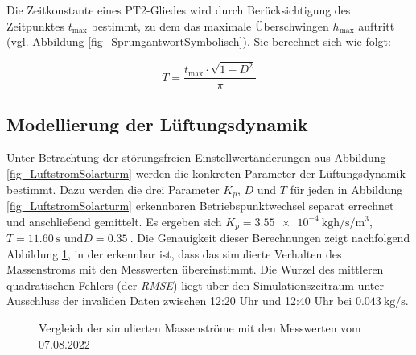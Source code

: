 Die Zeitkonstante eines PT2-Gliedes wird durch Berücksichtigung des Zeitpunktes $t_{\mathrm{max}}$ bestimmt, zu dem das maximale Überschwingen $h_{\mathrm{max}}$ auftritt (vgl. Abbildung \ref{fig_SprungantwortSymbolisch}).
Sie berechnet sich wie folgt:

\begin{equation} \label{eq_BerechnungT}
    T = \frac{t_{\mathrm{max}} \cdot \sqrt{1-D^2}}{\pi}
\end{equation}


\subsection{Modellierung der Lüftungsdynamik} \label{subsec_BeschreibungLüftungsDyn}
Unter Betrachtung der störungsfreien Einstellwertänderungen aus Abbildung \ref{fig_LuftstromSolarturm} werden die konkreten Parameter der Lüftungsdynamik bestimmt.
Dazu werden die drei Parameter $K_p$, $D$ und $T$ für jeden in Abbildung \ref{fig_LuftstromSolarturm} erkennbaren Betriebspunktwechsel separat errechnet und anschließend gemittelt.
Es ergeben sich $K_p = \SI{3.55e-4}{\kilo\gram\hour\per\second\per\metre\cubed}$, $T = \SI{11.60}{\second}$ und\linebreak $D = \SI{0.35}{}$.
Die Genauigkeit dieser Berechnungen zeigt nachfolgend Abbildung \ref{fig_LuftstromplusSimulativ}, in der erkennbar ist, dass das simulierte Verhalten des Massenstroms mit den Messwerten übereinstimmt.
Die Wurzel des mittleren quadratischen Fehlers (der \textit{RMSE}) liegt über den Simulationszeitraum unter Ausschluss der invaliden Daten zwischen 12:20 Uhr und 12:40 Uhr bei $\SI{0.043}{\kilo\gram\per\second}$.

\begin{figure}[h!]
    \centering
    \setlength{\fboxsep}{1pt}
    \setlength{\fboxrule}{1pt}
    \caption[Vergleich der simulierten Massenströme mit den Messwerten vom 07.08.2022]{Vergleich der simulierten Massenströme mit den Messwerten vom 07.08.2022}
    \label{fig_LuftstromplusSimulativ}
\end{figure}

